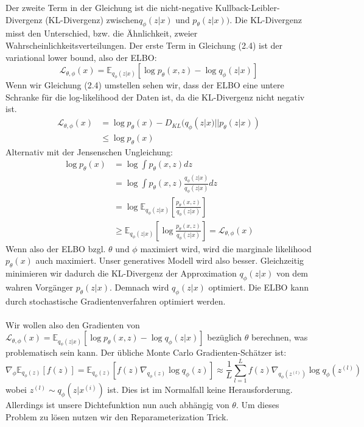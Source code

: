 \documentclass[%
thesis=student,%
coverpage=false,%
titlepage=false,%
headmarks=true, %
german,%
font=libertine, %
math=newpxtx, %
BCOR=5mm,%
coverBCOR=11mm%
]{tumbook}
\theoremstyle{break}
\begin{document}
Der zweite Term in der Gleichung ist die nicht-negative Kullback-Leibler-Divergenz (KL-Divergenz) zwischen$q_\phi(z|x)$ und $p_\theta(z|x))$. Die KL-Divergenz misst den Unterschied, bzw. die Ähnlichkeit, zweier Wahrscheinlichkeitsverteilungen.
Der erste Term in Gleichung (2.4) ist der variational lower bound, also der ELBO: 
$$\mathcal{L}_{\theta,\phi}(x) = \mathbb{E}_{q_\phi(z|x)}\left[\log p_\theta(x,z)- \log q_\phi(z|x)\right]$$
Wenn wir Gleichung (2.4) umstellen sehen wir, dass der ELBO eine untere Schranke für die log-likelihood der Daten ist, da die KL-Divergenz nicht negativ ist. 
\begin{align}
	\mathcal{L}_{\theta,\phi}(x) &= \log p_\theta(x) - D_{KL}(q_\phi(z|x)||p_\theta(z|x)) \\
	& \leq \log p_\theta(x)
\end{align}\noindent
Alternativ mit der Jensenschen Ungleichung:
\begin{align}
	\log p_\theta(x) &= \log \int p_\theta(x,z) dz \\
	&= \log \int p_\theta(x,z) \frac{q_\phi(z|x)}{q_\phi(z|x)} dz \\
	& = \log \mathbb{E}_{q_\phi(z|x)}\left[\frac{p_\theta(x,z)}{q_\phi(z|x)}\right] \\
	& \geq \mathbb{E}_{q_\phi(z|x)}\left[\log \frac{p_\theta(x,z)}{q_\phi(z|x)}\right] = \mathcal{L}_{\theta,\phi}(x)
\end{align}\noindent
Wenn also der ELBO bzgl. $\theta$ und  $\phi$ maximiert wird, wird die marginale likelihood $p_\theta(x)$ auch maximiert. Unser generatives Modell wird also besser. Gleichzeitig minimieren wir dadurch die KL-Divergenz der Approximation $q_\phi(z|x)$ von dem wahren Vorgänger $p_\theta(z|x)$. Demnach wird $q_\phi(z|x)$ optimiert. 
Die ELBO kann durch stochastische Gradientenverfahren optimiert werden.\\
\\
Wir wollen also den Gradienten von $\mathcal{L}_{\theta,\phi}(x) = \mathbb{E}_{q_\phi(z|x)}\left[\log p_\theta(x,z)- \log q_\phi(z|x)\right]$ bezüglich $\theta$ berechnen, was problematisch sein kann. Der übliche Monte Carlo Gradienten-Schätzer ist: 
$$ \nabla_\phi \mathbb{E}_{q_\phi(z)}[f(z)]= \mathbb{E}_{q_\phi(z)}[f(z)\nabla_{q_\phi(z)}\log q_\phi(z)] \approx \frac{1}{L} \sum_{l=1}^{L}f(z)\nabla_{q_\phi(z^{(l)})}\log q_\phi(z^{(l)})$$
wobei $z^{(l)} \sim q_\phi(z|x^{(i)})$ ist. 
Dies ist im Normalfall keine Herausforderung. Allerdings ist unsere Dichtefunktion nun auch abhängig von  $\theta$.  Um dieses Problem zu lösen nutzen wir den Reparameterization Trick.
\end{document}
